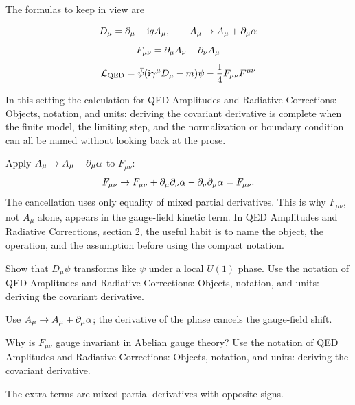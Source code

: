 The formulas to keep in view are

\[
  D_\mu=\partial_\mu+\mathrm i qA_\mu,\qquad A_\mu\to A_\mu+\partial_\mu\alpha
\]
\[
  F_{\mu\nu}=\partial_\mu A_\nu-\partial_\nu A_\mu
\]
\[
  \mathcal L_{\mathrm{QED}}=\bar\psi(\mathrm i\gamma^\mu D_\mu-m)\psi-\frac14F_{\mu\nu}F^{\mu\nu}
\]

In this setting the calculation for QED Amplitudes and Radiative Corrections: Objects, notation, and units: deriving the covariant derivative is complete when the finite model, the limiting step, and the normalization or boundary condition can all be named without looking back at the prose.




\begin{example}
Apply \(A_\mu\to A_\mu+\partial_\mu\alpha\) to \(F_{\mu\nu}\):
\[
  F_{\mu\nu}\to F_{\mu\nu}+\partial_\mu\partial_\nu\alpha-\partial_\nu\partial_\mu\alpha=F_{\mu\nu}.
\]
The cancellation uses only equality of mixed partial derivatives.  This is why \(F_{\mu\nu}\), not \(A_\mu\) alone, appears in the gauge-field kinetic term.  In QED Amplitudes and Radiative Corrections, section 2, the useful habit is to name the object, the operation, and the assumption before using the compact notation.
\end{example}



\begin{exercise}
Show that \(D_\mu\psi\) transforms like \(\psi\) under a local \(U(1)\) phase.  Use the notation of QED Amplitudes and Radiative Corrections: Objects, notation, and units: deriving the covariant derivative.
\begin{answer}
Use \(A_\mu\to A_\mu+\partial_\mu\alpha\); the derivative of the phase cancels the gauge-field shift.
\end{answer}
\end{exercise}

\begin{exercise}
Why is \(F_{\mu\nu}\) gauge invariant in Abelian gauge theory?  Use the notation of QED Amplitudes and Radiative Corrections: Objects, notation, and units: deriving the covariant derivative.
\begin{answer}
The extra terms are mixed partial derivatives with opposite signs.
\end{answer}
\end{exercise}



